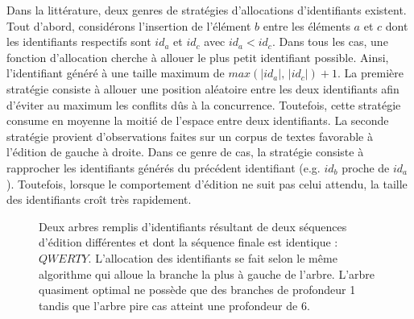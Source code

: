 Dans la littérature, deux genres de stratégies d'allocations d'identifiants
existent. Tout d'abord, considérons l'insertion de l'élément $b$ entre les
éléments $a$ et $c$ dont les identifiants respectifs sont $id_a$ et $id_c$ avec
$id_a<id_c$. Dans tous les cas, une fonction d'allocation cherche à allouer le
plus petit identifiant possible. Ainsi, l'identifiant généré à une taille
maximum de $max(|id_a|,\, |id_c|)+1$. La première stratégie consiste à allouer
une position aléatoire entre les deux identifiants afin d'éviter au maximum les
conflits dûs à la concurrence. Toutefois, cette stratégie consume en moyenne la
moitié de l'espace entre deux identifiants. La seconde stratégie provient
d'observations faites sur un corpus de textes favorable à l'édition de gauche à
droite. Dans ce genre de cas, la stratégie consiste à rapprocher les
identifiants générés du précédent identifiant (e.g. $id_b$ proche de
$id_a$). Toutefois, lorsque le comportement d'édition ne suit pas celui attendu,
la taille des identifiants croît très rapidement.

\begin{figure}
  \centering
  \hspace{40pt}
  \caption{\label{fig:lseq:allocpathexample} Deux arbres remplis d'identifiants
    résultant de deux séquences d'édition différentes et dont la séquence finale
    est identique : $QWERTY$. L'allocation des identifiants se fait selon le
    même algorithme qui alloue la branche la plus à gauche de l'arbre. L'arbre
    quasiment optimal ne possède que des branches de profondeur 1 tandis que
    l'arbre pire cas atteint une profondeur de 6.}
\end{figure}

